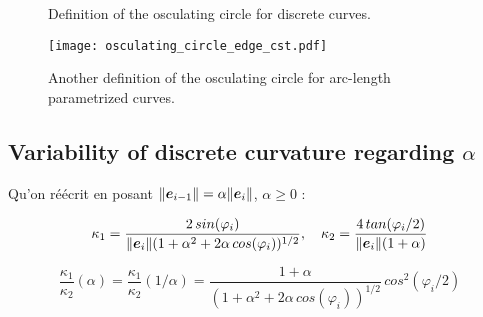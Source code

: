 \begin{figure}[h]
     \centering
     \caption{Definition of the osculating circle for discrete curves.}
     \label{steady_state}
\end{figure}

\begin{figure}[H] 
\begin{center}
\texttt{[image: osculating\_circle\_edge\_cst.pdf]} 
\caption{Another definition of the osculating circle for arc-length parametrized curves.}
\label{fig:1_1}
\end{center}
\end{figure}

\subsection{Variability of discrete curvature regarding $\alpha$}

Qu'on réécrit en posant $\|\boldsymbol{e}_{i-1}\| = \alpha \|\boldsymbol{e}_{i} \|$, $\alpha \geq 0$ :

\begin{equation}
	\kappa_1 = \frac{2 \,sin(\varphi_i)}{\|\boldsymbol{e}_{i}\|(1+ \alpha^2 + 2 \alpha \, cos(\varphi_i))^{1/2}},
	\quad
	\kappa_2 = \frac{4 \,tan(\varphi_i/2)}{\|\boldsymbol{e}_{i}\|(1+\alpha)}
\end{equation}

\begin{equation}
	\frac{\kappa_1}{\kappa_2}(\alpha) = \frac{\kappa_1}{\kappa_2}(1/\alpha)= \frac{1+\alpha}{(1+ \alpha^2 + 2 \alpha \, cos(\varphi_i))^{1/2}} \, cos^2(\varphi_i/2)
\end{equation}

